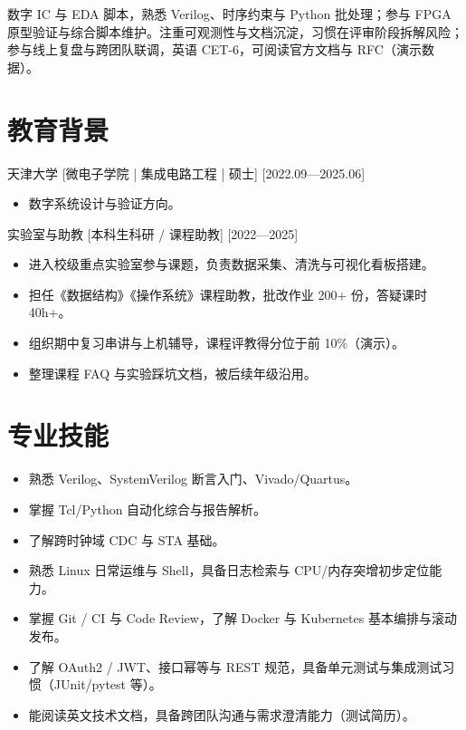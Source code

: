 \documentclass{resume-photo}
\begin{document}

\ResumeTitle

\noindent 数字 IC 与 EDA 脚本，熟悉 Verilog、时序约束与 Python 批处理；参与 FPGA 原型验证与综合脚本维护。注重可观测性与文档沉淀，习惯在评审阶段拆解风险；参与线上复盘与跨团队联调，英语 CET-6，可阅读官方文档与 RFC（演示数据）。

\section{教育背景}
\ResumeItem
{天津大学}
[\textnormal{微电子学院 | 集成电路工程 | 硕士}]
[2022.09—2025.06]

\begin{itemize}
  \item 数字系统设计与验证方向。
\end{itemize}


\ResumeItem
{实验室与助教}
[\textnormal{本科生科研 / 课程助教}]
[2022—2025]

\begin{itemize}
  \item 进入校级重点实验室参与课题，负责数据采集、清洗与可视化看板搭建。
  \item 担任《数据结构》《操作系统》课程助教，批改作业 200+ 份，答疑课时 40h+。
  \item 组织期中复习串讲与上机辅导，课程评教得分位于前 10\%（演示）。
  \item 整理课程 FAQ 与实验踩坑文档，被后续年级沿用。
\end{itemize}



\section{专业技能}
\begin{itemize}
  \item 熟悉 Verilog、SystemVerilog 断言入门、Vivado/Quartus。
  \item 掌握 Tcl/Python 自动化综合与报告解析。
  \item 了解跨时钟域 CDC 与 STA 基础。
  \item 熟悉 Linux 日常运维与 Shell，具备日志检索与 CPU/内存突增初步定位能力。
  \item 掌握 Git / CI 与 Code Review，了解 Docker 与 Kubernetes 基本编排与滚动发布。
  \item 了解 OAuth2 / JWT、接口幂等与 REST 规范，具备单元测试与集成测试习惯（JUnit/pytest 等）。
  \item 能阅读英文技术文档，具备跨团队沟通与需求澄清能力（测试简历）。
\end{itemize}
\end{document}
